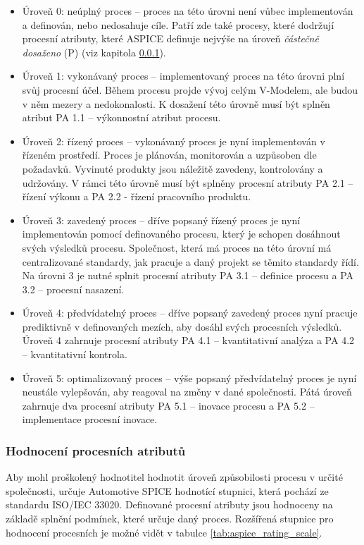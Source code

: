 \documentclass[czech,master,public,dept460,male,cpdeclaration,oneside]{diploma}
\begin{document}
\begin{itemize}
\item Úroveň 0: neúplný proces -- proces na této úrovni není vůbec implementován a definován, nebo nedosahuje cíle. Patří zde také procesy, které dodržují procesní atributy, které ASPICE definuje nejvýše na úroveň \textit{částečně dosaženo} (P) (viz kapitola \ref{sec:process_atributes}).

\item Úroveň 1: vykonávaný proces -- implementovaný proces na této úrovni plní svůj procesní účel. Během procesu projde vývoj celým V-Modelem, ale budou v něm mezery a nedokonalosti. K dosažení této úrovně musí být splněn atribut PA 1.1 -- výkonnostní atribut procesu.

\item Úroveň 2: řízený proces -- vykonávaný proces je nyní implementován v řízeném prostředí. Proces je plánován, monitorován a uzpůsoben dle požadavků. Vyvinuté produkty jsou náležitě zavedeny, kontrolovány a udržovány. V rámci této úrovně musí být splněny procesní atributy PA 2.1 -- řízení výkonu a PA 2.2 - řízení pracovního produktu.

\item Úroveň 3: zavedený proces -- dříve popsaný řízený proces je nyní implementován pomocí definovaného procesu, který je schopen dosáhnout svých výsledků procesu. Společnost, která má proces na této úrovní má centralizované standardy, jak pracuje a daný projekt se těmito standardy řídí. Na úrovni 3 je nutné splnit procesní atributy PA 3.1 -- definice procesu a PA 3.2 -- procesní nasazení.

\item Úroveň 4: předvídatelný proces -- dříve popsaný zavedený proces nyní pracuje prediktivně v definovaných mezích, aby dosáhl svých procesních výsledků. Úroveň 4 zahrnuje procesní atributy PA 4.1 -- kvantitativní analýza a PA 4.2 -- kvantitativní kontrola.

\item Úroveň 5: optimalizovaný proces -- výše popsaný předvídatelný proces je nyní neustále vylepšován, aby reagoval na změny v dané společnosti. Pátá úroveň zahrnuje dva procesní atributy PA 5.1 -- inovace procesu a PA 5.2 -- implementace procesní inovace.

\end{itemize}

\subsubsection{Hodnocení procesních atributů}
\label{sec:process_atributes}
Aby mohl proškolený hodnotitel hodnotit úroveň způsobilosti procesu v určité společnosti, určuje Automotive SPICE hodnotící stupnici, která pochází ze standardu ISO/IEC 33020. Definované procesní atributy jsou hodnoceny na základě splnění podmínek, které určuje daný proces. Rozšířená stupnice pro hodnocení procesních je možné vidět v tabulce \ref{tab:aspice_rating_scale}.
\end{document}
